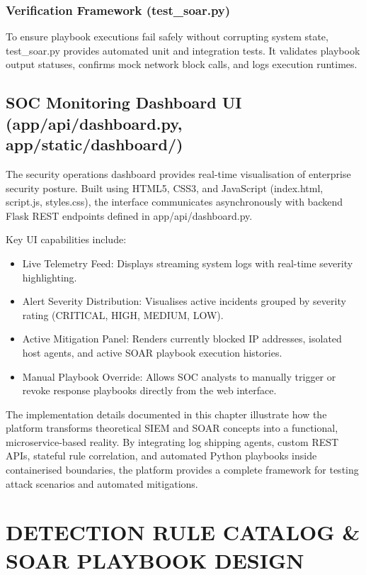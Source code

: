 \subsection{Verification Framework (test\_soar.py)}

To ensure playbook executions fail safely without corrupting system state, test\_soar.py provides automated unit and integration tests. It validates playbook output statuses, confirms mock network block calls, and logs execution runtimes.

\section{SOC Monitoring Dashboard UI (app/api/dashboard.py, app/static/dashboard/)}

The security operations dashboard provides real-time visualisation of enterprise security posture. Built using HTML5, CSS3, and JavaScript (index.html, script.js, styles.css), the interface communicates asynchronously with backend Flask REST endpoints defined in app/api/dashboard.py.

Key UI capabilities include:

\begin{itemize}
  \item Live Telemetry Feed: Displays streaming system logs with real-time severity highlighting.
  \item Alert Severity Distribution: Visualises active incidents grouped by severity rating (CRITICAL, HIGH, MEDIUM, LOW).
  \item Active Mitigation Panel: Renders currently blocked IP addresses, isolated host agents, and active SOAR playbook execution histories.
  \item Manual Playbook Override: Allows SOC analysts to manually trigger or revoke response playbooks directly from the web interface.
\end{itemize}

The implementation details documented in this chapter illustrate how the platform transforms theoretical SIEM and SOAR concepts into a functional, microservice-based reality. By integrating log shipping agents, custom REST APIs, stateful rule correlation, and automated Python playbooks inside containerised boundaries, the platform provides a complete framework for testing attack scenarios and automated mitigations.

\newpage
\chapter{DETECTION RULE CATALOG \& SOAR PLAYBOOK DESIGN}

